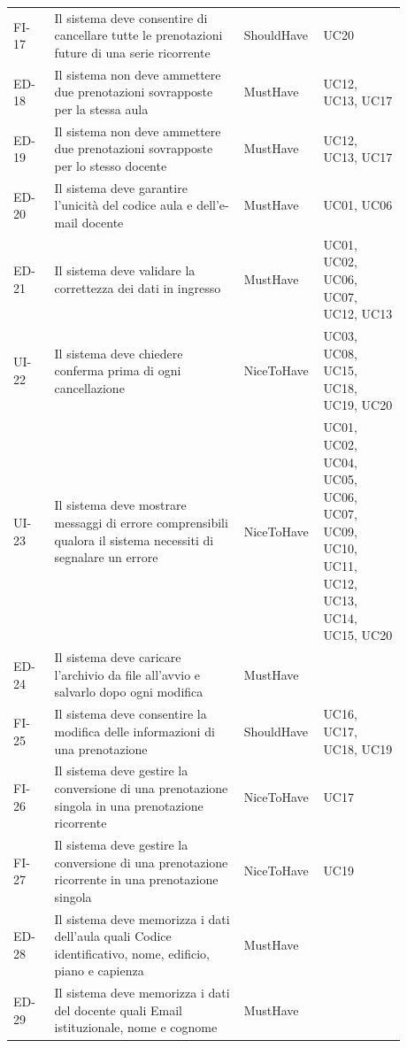 \documentclass[a4paper,11pt]{article}
\begin{document}
{\begin{longtable}{@{}H{0.10\linewidth} P{0.46\linewidth} P{0.12\linewidth} P{0.20\linewidth}@{}}
FI-17 & Il sistema deve consentire di cancellare tutte le prenotazioni future di una serie ricorrente & ShouldHave &\mbox{UC20} \\
ED-18 & Il sistema non deve ammettere due prenotazioni sovrapposte per la stessa aula & MustHave &\mbox{UC12}, \mbox{UC13}, \mbox{UC17} \\
ED-19 & Il sistema non deve ammettere due prenotazioni sovrapposte per lo stesso docente & MustHave &\mbox{UC12}, \mbox{UC13}, \mbox{UC17} \\
ED-20 & Il sistema deve garantire l'unicità del codice aula e dell'e-mail docente & MustHave &\mbox{UC01}, \mbox{UC06} \\
ED-21 & Il sistema deve validare la correttezza dei dati in ingresso & MustHave &\mbox{UC01}, \mbox{UC02}, \mbox{UC06}, \mbox{UC07}, \mbox{UC12}, \mbox{UC13} \\
UI-22 & Il sistema deve chiedere conferma prima di ogni cancellazione & NiceToHave &\mbox{UC03}, \mbox{UC08}, \mbox{UC15}, \mbox{UC18}, \mbox{UC19}, \mbox{UC20} \\
UI-23 & Il sistema deve mostrare messaggi di errore comprensibili qualora il sistema necessiti di segnalare un errore & NiceToHave &\mbox{UC01}, \mbox{UC02}, \mbox{UC04}, \mbox{UC05}, \mbox{UC06}, \mbox{UC07}, \mbox{UC09}, \mbox{UC10}, \mbox{UC11}, \mbox{UC12}, \mbox{UC13}, \mbox{UC14}, \mbox{UC15}, \mbox{UC20} \\
ED-24 & Il sistema deve caricare l'archivio da file all'avvio e salvarlo dopo ogni modifica & MustHave & \\
FI-25 & Il sistema deve consentire la modifica delle informazioni di una prenotazione & ShouldHave &\mbox{UC16}, \mbox{UC17}, \mbox{UC18}, \mbox{UC19} \\
FI-26 & Il sistema deve gestire la conversione di una prenotazione singola in una prenotazione ricorrente & NiceToHave &\mbox{UC17} \\
FI-27 & Il sistema deve gestire la conversione di una prenotazione ricorrente in una prenotazione singola & NiceToHave &\mbox{UC19} \\
ED-28 & Il sistema deve memorizza i dati dell'aula quali Codice identificativo, nome, edificio, piano e capienza & MustHave & \\
ED-29 & Il sistema deve memorizza i dati del docente quali Email istituzionale, nome e cognome & MustHave & \\

\end{longtable}}
\end{document}
